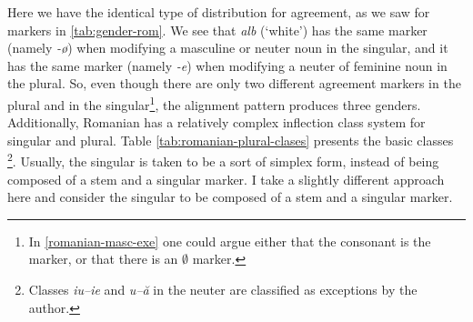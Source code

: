 Here we have the identical type of distribution for agreement, as we saw for markers in \ref{tab:gender-rom}. We see that \textit{alb} (`white') has the same marker (namely \textit{-ø}) when modifying a masculine or neuter noun in the singular, and it has the same marker (namely \textit{-e}) when modifying a neuter of feminine noun in the plural. So, even though there are only two different agreement markers in the plural and in the singular\footnote{In \ref{romanian-masc-exe} one could argue either that the consonant is the marker, or that there is an $\emptyset$ marker.}, the alignment pattern produces three genders. Additionally, Romanian has a relatively complex inflection class system for singular and plural. Table \ref{tab:romanian-plural-clases} presents the basic classes \autocite{Cojocaru.2003}\footnote{Classes \textit{iu--ie} and \textit{u--ă} in the neuter are classified as exceptions by the author.}. Usually, the singular is taken to be a sort of simplex form, instead of being composed of a stem and a singular marker. I take a slightly different approach here and consider the singular to be composed of a stem and a singular marker.

